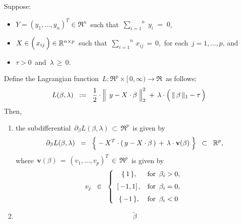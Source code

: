 
\vskip 0.5cm
\begin{lemma}
\mbox{}
\vskip 0.1cm
\noindent
Suppose:
\begin{itemize}
\item
	$Y = (y_{1},\ldots,y_{n})^{T} \in \Re^{n}$\,
	such that
	\,$\overset{n}{\underset{i=1}{\sum}}\;y_{i} \; = \; 0$,\,
\item
	$X \in \left(\,\overset{{\color{white}-}}{x_{ij}}\,\right)\in\Re^{n \times p}$\,
	such that
	\,$\overset{n}{\underset{i=1}{\sum}}\, x_{ij} \, = \, 0$,\,
	for each \,$j = 1,\ldots,p$, and
\item
	$\tau > 0$\, and \,$\lambda \,\geq\, 0$.
\end{itemize}
Define the Lagrangian function
\,$L : \Re^{p} \times [\,0,\infty) \longrightarrow \Re$\,
as follows:
\begin{equation*}
L(\beta,\lambda)
\;\; := \;\;
	\dfrac{1}{2}
	\cdot
	\left\Vert\;\, y \overset{{\color{white}.}}{-} X\cdot\beta \;\right\Vert_{2}^{2}
	\; + \,
	\lambda\cdot\left(\,\Vert\,\beta\,\Vert_{1} \overset{{\color{white}.}}{-} \tau\,\right)
\end{equation*}
Then,
\begin{enumerate}
\item
	the subdifferential
	\,$\partial_{\beta} L(\beta,\lambda) \,\subset\, \Re^{p}$\,
	is given by
	\begin{equation*}
		\partial_{\beta} L(\beta,\lambda)
	\;\; = \;\;
		\left\{\;
			- \, X^{T} \cdot (\,y - X \cdot \beta\,)
			\, \overset{{\color{white}.}}{+} \,
			\lambda\cdot\mathbf{v}(\beta)
			\;\right\}
	\;\; \subset \;\;
		\Re^{p},
	\end{equation*}
	where \,$\mathbf{v}(\beta) \,=\, (v_{1},\ldots,v_{p})^{T} \,\in\, \Re^{p}$\, is given by
	\begin{equation*}
	v_{j}
	\;\; \in \;\;
		\left\{\begin{array}{cl}
			\{\,1\,\}, & \textnormal{for \,$\beta_{i} > 0$},
			\\
			\left[\,-1,1\right], & \overset{{\color{white}1}}{\textnormal{for \,$\beta_{i} = 0$}},
			\\
			\{\,-1\,\}, & \overset{{\color{white}1}}{\textnormal{for \,$\beta_{i} < 0$}}
			\end{array}\right.
	\end{equation*}
\item
	\begin{equation*}
	\widetilde{\beta}

\end{equation*}
\end{enumerate}
\end{lemma}
